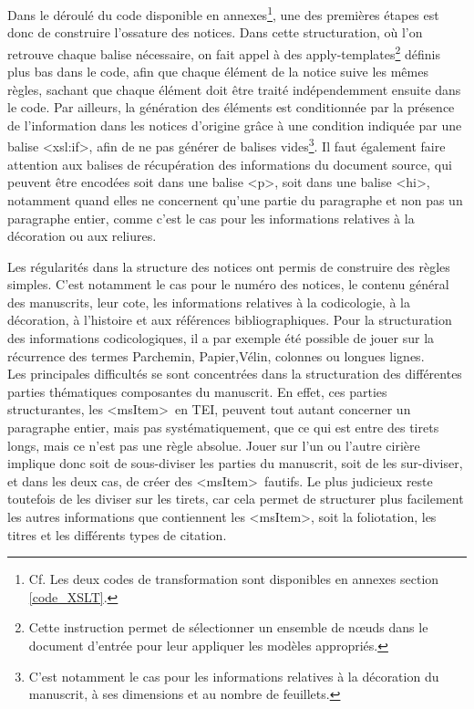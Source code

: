 \documentclass[a4paper,12pt,twoside]{book}
\begin{document}
Dans le déroulé du code disponible en annexes\footnote{Cf. Les deux codes de transformation sont disponibles en annexes section \ref{code_XSLT}.}, une des premières étapes est donc de construire l'ossature des notices. Dans cette structuration, où l'on retrouve chaque balise nécessaire, on fait appel à des apply-templates\footnote{Cette instruction permet de sélectionner un ensemble de nœuds dans le document d'entrée pour leur appliquer les modèles appropriés.} définis plus bas dans le code, afin que chaque élément de la notice suive les mêmes règles, sachant que chaque élément doit être traité indépendemment ensuite dans le code. Par ailleurs, la génération des éléments est conditionnée par la présence de l'information dans les notices d'origine grâce à une condition indiquée par une balise \textless xsl:if\textgreater, afin de ne pas générer de balises vides\footnote{C'est notamment le cas pour les informations relatives à la décoration du manuscrit, à ses dimensions et au nombre de feuillets.}. Il faut également faire attention aux balises de récupération des informations du document source, qui peuvent être encodées soit dans une balise \textless p\textgreater, soit dans une balise \textless hi\textgreater, notamment quand elles ne concernent qu'une partie du paragraphe et non pas un paragraphe entier, comme c'est le cas pour les informations relatives à la décoration ou aux reliures.

Les régularités dans la structure des notices ont permis de construire des règles simples. C'est notamment le cas pour le numéro des notices, le contenu général des manuscrits, leur cote, les informations relatives à la codicologie, à la décoration, à l'histoire et aux références bibliographiques. Pour la structuration des informations codicologiques, il a par exemple été possible de jouer sur la récurrence des termes \og Parchemin\fg{}, \og Papier\fg{},\og  Vélin\fg{}, \og colonnes\fg{} ou \og longues lignes\fg{}.\\

Les principales difficultés se sont concentrées dans la structuration des différentes parties thématiques composantes du manuscrit. En effet, ces parties structurantes, les \textless msItem\textgreater~en TEI, peuvent tout autant concerner un paragraphe entier, mais pas systématiquement, que ce qui est entre des tirets longs, mais ce n'est pas une règle absolue. Jouer sur l'un ou l'autre cirière implique donc soit de sous-diviser les parties du manuscrit, soit de les sur-diviser, et dans les deux cas, de créer des \textless msItem\textgreater~fautifs. Le plus judicieux reste toutefois de les diviser sur les tirets, car cela permet de structurer plus facilement les autres informations que contiennent les \textless msItem\textgreater, soit la foliotation, les titres et les différents types de citation.
\end{document}
